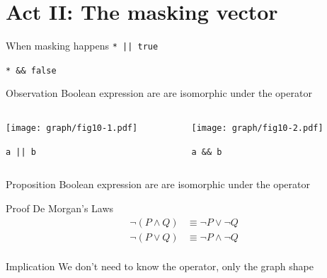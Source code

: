 \documentclass[xcolor = {dvipsnames, table}]{beamer}
\begin{document}
\section{Act II: The masking vector}

\begin{frame}[fragile]
    \begin{block}{When masking happens}
        \lstinline{* || true}

        \lstinline{* && false}
    \end{block}
\end{frame}

\begin{frame}[fragile]
    \begin{block}{Observation}
        Boolean expression are are isomorphic under the operator
    \end{block}

    \begin{columns}
        \begin{column}{0.4\textwidth}
            \centering
            \texttt{[image: graph/fig10-1.pdf]}

            \lstinline{a || b}
        \end{column}
        \begin{column}{0.4\textwidth}
            \centering
            \texttt{[image: graph/fig10-2.pdf]}

            \lstinline{a && b}
        \end{column}
    \end{columns}
\end{frame}

\begin{frame}
    \begin{block}{Proposition}
        Boolean expression are are isomorphic under the operator
    \end{block}

    \begin{block}{Proof}
        De Morgan's Laws
        \begin{align*}
            \neg(P \wedge Q) & \equiv \neg P \vee \neg Q \\
            \neg(P \vee Q) & \equiv \neg P \wedge \neg Q \\
        \end{align*}
    \end{block}

    \begin{block}{Implication}
        We don't need to know the operator, only the graph shape
    \end{block}
\end{frame}
\end{document}
